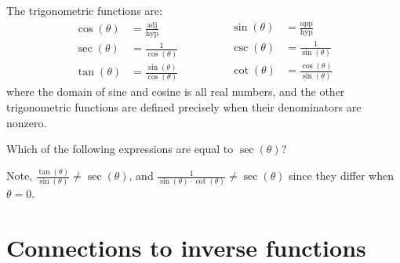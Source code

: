 \documentclass{ximera}
\begin{document}
\begin{definition}
  The trigonometric functions are:
  \[
  \begin{aligned}
  \cos(\theta) &= \frac{\text{adj}}{\text{hyp}}\\
  \sec(\theta) &= \frac{1}{\cos(\theta)}\\
  \tan(\theta) &= \frac{\sin(\theta)}{\cos(\theta)}\qquad
  \end{aligned}
  \qquad
  \begin{aligned}
  \sin(\theta) &= \frac{\text{opp}}{\text{hyp}}\\
  \csc(\theta) &= \frac{1}{\sin(\theta)}\\
  \cot(\theta) &= \frac{\cos(\theta)}{\sin(\theta)}    
  \end{aligned}
  \]
  where the domain of sine and cosine is all real numbers, and the
  other trigonometric functions are defined precisely when their
  denominators are nonzero.
\end{definition}

\begin{question}
  Which of the following expressions are equal to $\sec(\theta)$?
  \begin{selectAll}
    \choice{$\frac{\tan(\theta)}{\sin(\theta)}$}
  \end{selectAll}
  \begin{feedback}
    Note, $\frac{\tan(\theta)}{\sin(\theta)}\ne \sec(\theta)$, and
    $\frac{1}{\sin(\theta)\cdot\cot(\theta)}\ne \sec(\theta)$ since
    they differ when $\theta =0$.
  \end{feedback}
\end{question}


  
\section{Connections to inverse functions}
\end{document}
